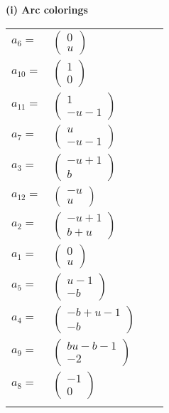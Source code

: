 \documentclass[1p]{elsarticle_modified}
\theoremstyle{definition}
\begin{document}
\flushleft \textbf{(i) Arc colorings}\\
\begin{tabular}{m{7pt} m{180pt} m{7pt} m{180pt} }
\flushright $a_{6}=$&$\begin{pmatrix}0\\u\end{pmatrix}$ \\
\flushright $a_{10}=$&$\begin{pmatrix}1\\0\end{pmatrix}$ \\
\flushright $a_{11}=$&$\begin{pmatrix}1\\- u-1\end{pmatrix}$ \\
\flushright $a_{7}=$&$\begin{pmatrix}u\\- u-1\end{pmatrix}$ \\
\flushright $a_{3}=$&$\begin{pmatrix}- u+1\\b\end{pmatrix}$ \\
\flushright $a_{12}=$&$\begin{pmatrix}- u\\u\end{pmatrix}$ \\
\flushright $a_{2}=$&$\begin{pmatrix}- u+1\\b+u\end{pmatrix}$ \\
\flushright $a_{1}=$&$\begin{pmatrix}0\\u\end{pmatrix}$ \\
\flushright $a_{5}=$&$\begin{pmatrix}u-1\\- b\end{pmatrix}$ \\
\flushright $a_{4}=$&$\begin{pmatrix}- b+u-1\\- b\end{pmatrix}$ \\
\flushright $a_{9}=$&$\begin{pmatrix}b u- b-1\\-2\end{pmatrix}$ \\
\flushright $a_{8}=$&$\begin{pmatrix}-1\\0\end{pmatrix}$\\&\end{tabular}
\end{document}
